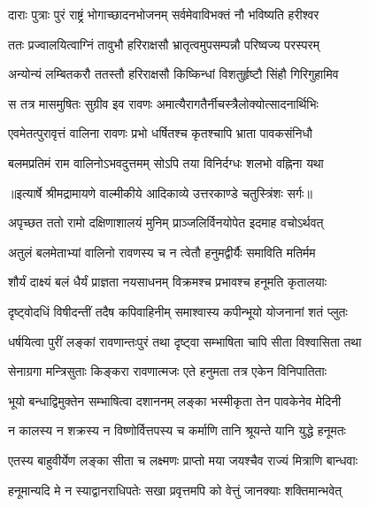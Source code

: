 \twolineshloka
{दाराः पुत्राः पुरं राष्ट्रं भोगाच्छादनभोजनम्}
{सर्वमेवाविभक्तं नौ भविष्यति हरीश्वर} %

\twolineshloka
{ततः प्रज्वालयित्वाग्निं तावुभौ हरिराक्षसौ}
{भ्रातृत्वमुपसम्पन्नौ परिष्वज्य परस्परम्} %

\twolineshloka
{अन्योन्यं लम्बितकरौ ततस्तौ हरिराक्षसौ}
{किष्किन्धां विशतुर्हृष्टौ सिंहौ गिरिगुहामिव} %

\twolineshloka
{स तत्र मासमुषितः सुग्रीव इव रावणः}
{अमात्यैरागतैर्नीचस्त्रैलोक्योत्सादनार्थिभिः} %

\twolineshloka
{एवमेतत्पुरावृत्तं वालिना रावणः प्रभो}
{धर्षितश्च कृतश्चापि भ्राता पावकसंनिधौ} %

\twolineshloka
{बलमप्रतिमं राम वालिनोऽभवदुत्तमम्}
{सोऽपि तया विनिर्दग्धः शलभो वह्निना यथा} %


{॥इत्यार्षे श्रीमद्रामायणे वाल्मीकीये आदिकाव्ये उत्तरकाण्डे चतुस्त्रिंशः सर्गः॥}


\twolineshloka
{अपृच्छत ततो रामो दक्षिणाशालयं मुनिम्}
{प्राञ्जलिर्विनयोपेत इदमाह वचोऽर्थवत्} %

\twolineshloka
{अतुलं बलमेताभ्यां वालिनो रावणस्य च}
{न त्वेतौ हनुमद्वीर्यैः समाविति मतिर्मम} %

\twolineshloka
{शौर्यं दाक्ष्यं बलं धैर्यं प्राज्ञता नयसाधनम्}
{विक्रमश्च प्रभावश्च हनूमति कृतालयाः} %

\twolineshloka
{दृष्ट्वोदधिं विषीदन्तीं तदैष कपिवाहिनीम्}
{समाश्वास्य कपीन्भूयो योजनानां शतं प्लुतः} %

\twolineshloka
{धर्षयित्वा पुरीं लङ्कां रावणान्तःपुरं तथा}
{दृष्ट्वा सम्भाषिता चापि सीता विश्वासिता तथा} %

\twolineshloka
{सेनाग्रगा मन्त्रिसुताः किङ्करा रावणात्मजः}
{एते हनुमता तत्र एकेन विनिपातिताः} %

\twolineshloka
{भूयो बन्धाद्विमुक्तेन सम्भाषित्वा दशाननम्}
{लङ्का भस्मीकृता तेन पावकेनेव मेदिनी} %

\twolineshloka
{न कालस्य न शक्रस्य न विष्णोर्वित्तपस्य च}
{कर्माणि तानि श्रूयन्ते यानि युद्धे हनूमतः} %

\twolineshloka
{एतस्य बाहुवीर्येण लङ्का सीता च लक्ष्मणः}
{प्राप्तो मया जयश्चैव राज्यं मित्राणि बान्धवाः} %

\twolineshloka
{हनूमान्यदि मे न स्याद्वानराधिपतेः सखा}
{प्रवृत्तमपि को वेत्तुं जानक्याः शक्तिमान्भवेत्} %

